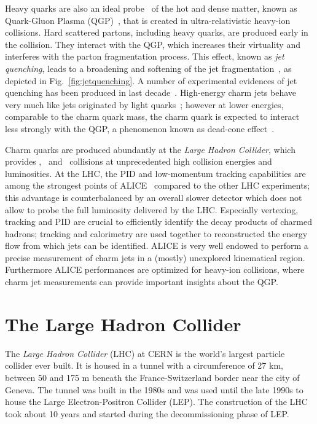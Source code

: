 \documentclass[12pt, a4paper, twoside, titlepage]{article}
\begin{document}
Heavy quarks are also an ideal probe~\cite{} of the hot and dense matter, known as Quark-Gluon Plasma (QGP)~\cite{}, that is created in ultra-relativistic heavy-ion collisions. 
Hard scattered partons, including heavy quarks, are produced early in the collision. They interact with the QGP, which increases their virtuality and interferes with the
parton fragmentation process. This effect, known as \emph{jet quenching}, leads to a broadening and softening of the jet fragmentation~\cite{}, as depicted in Fig.~\ref{fig:jetquenching}. A number of
experimental evidences of jet quenching has been produced in last decade~\cite{}.
High-energy charm jets behave very much like jets originated by light quarks~\cite{}; however at lower energies, comparable to the charm quark mass, the charm quark is expected
to interact less strongly with the QGP, a phenomenon known as dead-cone effect~\cite{}. 

Charm quarks are produced abundantly at the \emph{Large Hadron Collider}, which provides \pp, \pPb\ and \PbPb\ collisions at unprecedented high collision energies and luminosities.
At the LHC, the PID and low-momentum tracking capabilities are among the strongest points of ALICE~\cite{} compared to the other LHC experiments; 
this advantage is counterbalanced by an overall slower detector which does not allow to probe the full luminosity delivered by the LHC. 
Especially vertexing, tracking and PID are crucial to efficiently identify the decay products of charmed hadrons; tracking and calorimetry are used together to reconstructed the energy flow from which jets can be identified.
ALICE is very well endowed to perform a precise measurement of charm jets in a (mostly) unexplored kinematical region. Furthermore ALICE performances
are optimized for heavy-ion collisions, where charm jet measurements can provide important insights about the QGP.

\section{The Large Hadron Collider}
The \emph{Large Hadron Collider} (LHC) at CERN is the world's largest particle collider ever built.
It is housed in a tunnel with a circumference of 27 km, between 50 and 175 m beneath
the France-Switzerland border near the city of Geneva. The tunnel was built in the 1980s and was used until 
the late 1990s to house the Large Electron-Positron Collider (LEP). The construction of the LHC took about 10 years and started
during the decommissioning phase of LEP. 
\end{document}
